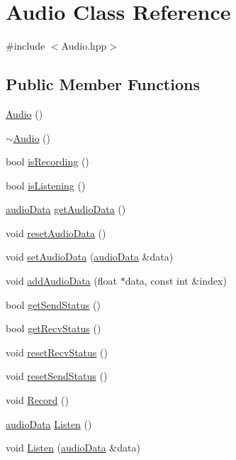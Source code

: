 \hypertarget{classAudio}{}\section{Audio Class Reference}
\label{classAudio}


{\ttfamily \#include $<$Audio.\+hpp$>$}

\subsection*{Public Member Functions}
\begin{DoxyCompactItemize}
\item 
\hyperlink{classAudio_aa9d3935a2b91ab4b825bc0cb05f245ea}{Audio} ()
\item 
\hyperlink{classAudio_ae8f54deecb5f48511aaab469e80294d6}{$\sim$\+Audio} ()
\item 
bool \hyperlink{classAudio_a871e82444419a2b5a9604d65fee23684}{is\+Recording} ()
\item 
bool \hyperlink{classAudio_a3daea1aa8c67413ca520fd49688c799e}{is\+Listening} ()
\item 
\hyperlink{structaudioData}{audio\+Data} \hyperlink{classAudio_a58f3992de74732128644d966102cd211}{get\+Audio\+Data} ()
\item 
void \hyperlink{classAudio_a604b771547540295ddf385556a652e38}{reset\+Audio\+Data} ()
\item 
void \hyperlink{classAudio_af857b4249543a018a264f852610b0b17}{set\+Audio\+Data} (\hyperlink{structaudioData}{audio\+Data} \&data)
\item 
void \hyperlink{classAudio_aa32f7a0d28f33b6c7b40849b7bed17ec}{add\+Audio\+Data} (float $\ast$data, const int \&index)
\item 
bool \hyperlink{classAudio_a397b2ca56d953632f183d5a6d62f564f}{get\+Send\+Status} ()
\item 
bool \hyperlink{classAudio_a5017e5dd1eb6695e880535054e05d1e6}{get\+Recv\+Status} ()
\item 
void \hyperlink{classAudio_af44fb4e83b466e7be6f9d5b137c35fbe}{reset\+Recv\+Status} ()
\item 
void \hyperlink{classAudio_a73bbc82c0b6532c9d7ca41c755c3ceac}{reset\+Send\+Status} ()
\item 
void \hyperlink{classAudio_a43d80bf049a368b27573974f8e5489a0}{Record} ()
\item 
\hyperlink{structaudioData}{audio\+Data} \hyperlink{classAudio_a4fba3b2f9ea1e28f90b338a7cccd4d89}{Listen} ()
\item 
void \hyperlink{classAudio_a9eead377be9b7fbab2c49fa90007ebc1}{Listen} (\hyperlink{structaudioData}{audio\+Data} \&data)
\end{DoxyCompactItemize}


